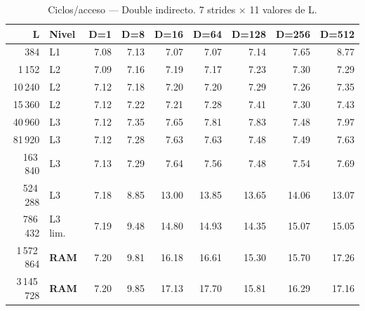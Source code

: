 \documentclass[12pt,a4paper]{article}
\newcommand{\cverde}[1]{\textcolor{verde}{#1}}
\newcommand{\cnaranja}[1]{\textcolor{naranja}{#1}}
\newcommand{\crojo}[1]{\textcolor{rojo}{#1}}
\begin{document}
\begin{table}[H]
\centering
\caption{Ciclos/acceso --- Double indirecto. 7 strides $\times$ 11 valores de L.}
\label{tab:double_ind}
\setlength{\tabcolsep}{4pt}\footnotesize
\begin{tabular}{rlrrrrrrr}
\toprule
\textbf{L} & \textbf{Nivel} & \textbf{D=1} & \textbf{D=8} & \textbf{D=16} & \textbf{D=64} & \textbf{D=128} & \textbf{D=256} & \textbf{D=512} \\
\midrule
384         & L1         & \cverde{7.08}  & \cverde{7.13} & \cverde{7.07} & \cverde{7.07} & \cverde{7.14} & \cverde{7.65}  & \cnaranja{8.77} \\
1\,152      & L2         & \cverde{7.09}  & \cverde{7.16} & \cverde{7.19} & \cverde{7.17} & \cverde{7.23} & \cverde{7.30}  & \cverde{7.29} \\
10\,240     & L2         & \cverde{7.12}  & \cverde{7.18} & \cverde{7.20} & \cverde{7.20} & \cverde{7.29} & \cverde{7.26}  & \cverde{7.35} \\
15\,360     & L2         & \cverde{7.12}  & \cverde{7.22} & \cverde{7.21} & \cverde{7.28} & \cverde{7.41} & \cverde{7.30}  & \cverde{7.43} \\
40\,960     & L3         & \cverde{7.12}  & \cverde{7.35} & \cverde{7.65} & \cverde{7.81} & \cverde{7.83} & \cverde{7.48}  & \cverde{7.97} \\
81\,920     & L3         & \cverde{7.12}  & \cverde{7.28} & \cverde{7.63} & \cverde{7.63} & \cverde{7.48} & \cverde{7.49}  & \cverde{7.63} \\
163\,840    & L3         & \cverde{7.13}  & \cverde{7.29} & \cverde{7.64} & \cverde{7.56} & \cverde{7.48} & \cverde{7.54}  & \cverde{7.69} \\
524\,288    & L3         & \cverde{7.18}  & \cnaranja{8.85} & \crojo{13.00} & \crojo{13.85} & \crojo{13.65} & \crojo{14.06} & \crojo{13.07} \\
786\,432    & L3 lim.    & \cverde{7.19}  & \cnaranja{9.48} & \crojo{14.80} & \crojo{14.93} & \crojo{14.35} & \crojo{15.07} & \crojo{15.05} \\
1\,572\,864 & \textbf{RAM} & \cverde{7.20} & \cnaranja{9.81} & \crojo{16.18} & \crojo{16.61} & \crojo{15.30} & \crojo{15.70} & \crojo{17.26} \\
3\,145\,728 & \textbf{RAM} & \cverde{7.20} & \cnaranja{9.85} & \crojo{17.13} & \crojo{17.70} & \crojo{15.81} & \crojo{16.29} & \crojo{17.16} \\
\bottomrule
\end{tabular}
\end{table}
\end{document}
